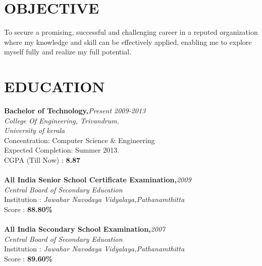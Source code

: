 \documentclass[line,margin]{res}
\begin{document}
\address{\large abilngeorge@gmail.com}
\address{\large (+91)9497359361}

\thispagestyle{empty} %

\begin{resume}
  
  \section{OBJECTIVE}       
To secure a promising, successful and challenging career in a reputed organization where my knowledge and skill can be effectively applied, enabling me to explore myself fully and realize my full potential.\\

  \section{EDUCATION} 
          {\bf Bachelor of Technology,}\hfill {\it Present 2009-2013}\\
          {\it College Of Engineering, Trivandrum.} \\
          {\it University of kerala}\\ 
          Concentration: Computer Science \& Engineering \\
          Expected Completion: Summer 2013.\\ 
          CGPA (Till Now) : {\bf 8.87} \\\\
          {\bf All India Senior School Certificate Examination,}\hfill {\it 2009}\\        
          {\it Central Board of Secondary Education}\\
          Institution : {\it Jawahar Navodaya Vidyalaya,Pathanamthitta} \\ 
          Score       : {\bf 88.80\% } \\\\
          {\bf All India Secondary School Examination,}\hfill {\it 2007}\\
          {\it Central Board of Secondary Education}\\
          Institution : {\it Jawahar Navodaya Vidyalaya,Pathanamthitta} \\ 
          Score       : {\bf 89.60\% } \\\\

\end{resume}
\end{document}

